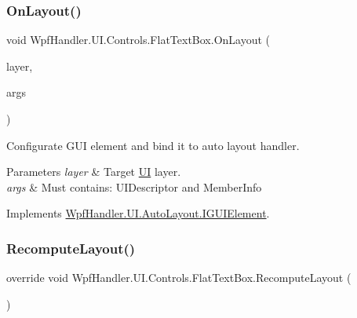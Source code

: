\subsubsection{\texorpdfstring{On\+Layout()}{OnLayout()}}
{\footnotesize\ttfamily void Wpf\+Handler.\+U\+I.\+Controls.\+Flat\+Text\+Box.\+On\+Layout (\begin{DoxyParamCaption}\item[{ref \mbox{\hyperlink{class_wpf_handler_1_1_u_i_1_1_auto_layout_1_1_layout_layer}{Layout\+Layer}}}]{layer,  }\item[{params object \mbox{[}$\,$\mbox{]}}]{args }\end{DoxyParamCaption})}



Configurate G\+UI element and bind it to auto layout handler. 


\begin{DoxyParams}{Parameters}
{\em layer} & Target \mbox{\hyperlink{namespace_wpf_handler_1_1_u_i}{UI}} layer.\\
\hline
{\em args} & Must contains\+: U\+I\+Descriptor and Member\+Info\\
\hline
\end{DoxyParams}


Implements \mbox{\hyperlink{interface_wpf_handler_1_1_u_i_1_1_auto_layout_1_1_i_g_u_i_element_a0ff16956f8e8187d51e1b36b6b9f894e}{Wpf\+Handler.\+U\+I.\+Auto\+Layout.\+I\+G\+U\+I\+Element}}.

\mbox{\label{class_wpf_handler_1_1_u_i_1_1_controls_1_1_flat_text_box_af96bd0b4244565a1ca7a137d56296cda}} 
\subsubsection{\texorpdfstring{Recompute\+Layout()}{RecomputeLayout()}}
{\footnotesize\ttfamily override void Wpf\+Handler.\+U\+I.\+Controls.\+Flat\+Text\+Box.\+Recompute\+Layout (\begin{DoxyParamCaption}{ }\end{DoxyParamCaption})\hspace{0.3cm}{\ttfamily [virtual]}}



